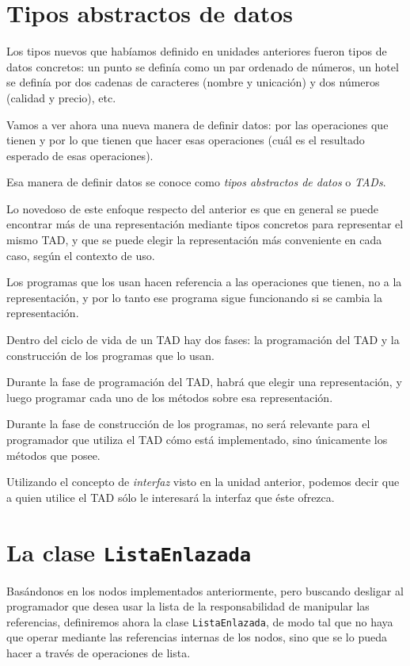\section{Tipos abstractos de datos}

Los tipos nuevos que habíamos definido en unidades anteriores fueron tipos de
datos concretos: un punto se definía como un par ordenado de números, un hotel
se definía por dos cadenas de caracteres (nombre y unicación) y dos números
(calidad y precio), etc.

Vamos a ver ahora una nueva manera de definir datos: por las
operaciones que tienen y por lo que tienen que hacer esas
operaciones (cuál es el resultado esperado de esas operaciones).

Esa manera de definir datos se conoce como \emph{tipos abstractos de datos} o
\emph{TADs}.

Lo novedoso de este enfoque respecto del anterior es que en general se puede
encontrar más de una representación mediante tipos concretos para representar
el mismo TAD, y que se puede elegir la representación más conveniente en cada
caso, según el contexto de uso.

Los programas que los usan hacen referencia a las operaciones que tienen, no a
la representación, y por lo tanto ese programa sigue funcionando si se cambia
la representación.

Dentro del ciclo de vida de un TAD hay dos fases: la programación del TAD y
la construcción de los programas que lo usan.

Durante la fase de programación del TAD, habrá que elegir una
representación, y luego programar cada uno de los métodos sobre esa
representación.

Durante la fase de construcción de los programas, no será relevante para el
programador que utiliza el TAD cómo está implementado, sino únicamente los
métodos que posee.

\begin{observacion}
Utilizando el concepto de \emph{interfaz} visto en la unidad anterior, podemos
decir que a quien utilice el TAD sólo le interesará la interfaz que éste
ofrezca.
\end{observacion}

\section{La clase {\tt ListaEnlazada}}

Basándonos en los nodos implementados anteriormente, pero buscando
desligar al programador que desea usar la lista de la responsabilidad de
manipular las referencias, definiremos ahora la clase
\lstinline!ListaEnlazada!, de modo tal que no haya que operar mediante las
referencias internas de los nodos, sino que se lo pueda hacer a través de
operaciones de lista.

